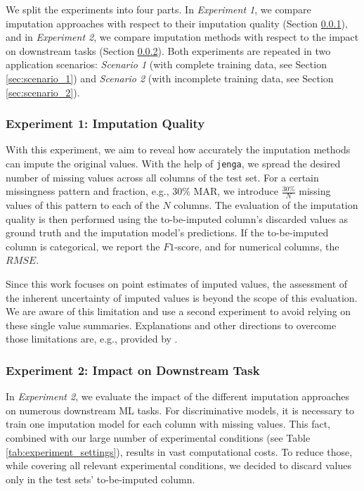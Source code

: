 \documentclass[utf8]{frontiersSCNS} %
\newcommand{\code}[1]{\texttt{#1}}
\begin{document}
We split the experiments into four parts. In \emph{Experiment 1}, we compare imputation approaches with respect to their imputation quality (Section \ref{sec:experiment_1}), and in \emph{Experiment 2}, we compare imputation methods with respect to the impact on downstream tasks (Section \ref{sec:experiment_2}). Both experiments are repeated in two application scenarios: \emph{Scenario 1} (with complete training data, see Section \ref{sec:scenario_1}) and \emph{Scenario 2} (with incomplete training data, see Section \ref{sec:scenario_2}).

\subsubsection{Experiment 1: Imputation Quality}
\label{sec:experiment_1}
%
With this experiment, we aim to reveal how accurately the imputation methods can impute the original values.
With the help of \code{jenga}, we spread the desired number of missing values across all columns of the test set. For a certain missingness pattern and fraction, e.g., $30\%$ MAR, we introduce $\frac{30\%}{N}$ missing values of this pattern to each of the $N$ columns.
The evaluation of the imputation quality is then performed using the to-be-imputed column's discarded values as ground truth and the imputation model's predictions. If the to-be-imputed column is categorical, we report the $F1$-score, and for numerical columns, the $RMSE$.

Since this work focuses on point estimates of imputed values, the assessment of the inherent uncertainty of imputed values is beyond the scope of this evaluation. We are aware of this limitation and use a second experiment to avoid relying on these single value summaries. Explanations and other directions to overcome those limitations are, e.g., provided by \cite{limitations}.


\subsubsection{Experiment 2: Impact on Downstream Task}
\label{sec:experiment_2}
%
In \emph{Experiment 2}, we evaluate the impact of the different imputation approaches on numerous downstream ML tasks. For discriminative models, it is necessary to train one imputation model for each column with missing values. This fact, combined with our large number of experimental conditions (see Table \ref{tab:experiment_settings}), results in vast computational costs. To reduce those, while covering all relevant experimental conditions, we decided to discard values only in the test sets' to-be-imputed column.
\end{document}
